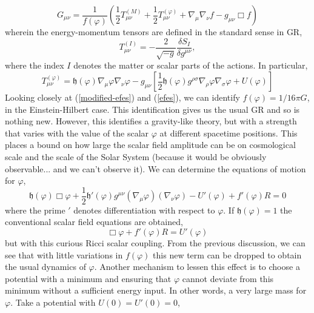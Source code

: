 \begin{equation}\label{modified-efes}
    G_{\mu\nu} = \frac{1}{f(\varphi)}\left(\frac{1}{2}T_{\mu\nu}^{(M)} + \frac{1}{2}T_{\mu\nu}^{(\varphi)} + \nabla_{\mu}\nabla_{\nu}f - g_{\mu\nu}\Box f\right)
\end{equation}
wherein the energy-momentum tensors are defined in the standard sense in GR,
\begin{equation}
T^{(I)}_{\mu\nu} = -\frac{2}{\sqrt{-g}}\frac{\delta S_{I}}{\delta g^{\mu\nu}},
\end{equation}
where the index $I$ denotes the matter or scalar parts of the actions. In particular, 
\begin{equation}
    T_{\mu\nu}^{(\varphi)} = \mathfrak{h}(\varphi)\nabla_{\mu}\varphi\nabla_{\nu}\varphi - g_{\mu\nu}\left[\frac{1}{2}\mathfrak{h}(\varphi)g^{\rho\sigma}\nabla_{\rho}\varphi\nabla_{\sigma}\varphi + U(\varphi)\right]
\end{equation}
Looking closely at (\ref{modified-efes}) and (\ref{efes}), we can identify $f(\varphi) = 1/16\pi G$, in the Einstein-Hilbert case. This identification gives us the usual GR and so is nothing new. However, this identifies a gravity-like theory, but with a strength that varies with the value of the scalar $\varphi$ at different spacetime positions. This places a bound on how large the scalar field amplitude can be on cosmological scale and the scale of the Solar System (because it would be obviously observable... and we can't observe it). We can determine the equations of motion for $\varphi$, 
\begin{equation}
    \mathfrak{h}(\varphi)\Box\varphi + \frac{1}{2}\mathfrak{h}'(\varphi)g^{\mu\nu}(\nabla_{\mu}\varphi)(\nabla_{\nu}\varphi) - U'(\varphi) + f'(\varphi)R = 0
\end{equation}
where the prime $'$ denotes differentiation with respect to $\varphi$. If $\mathfrak{h}(\varphi) = 1$ the conventional scalar field equations are obtained, 
\begin{equation}
    \Box\varphi + f'(\varphi)R= U'(\varphi)
\end{equation}
but with this curious Ricci scalar coupling. From the previous discussion, we can see that with little variations in $f(\varphi)$ this new term can be dropped to obtain the usual dynamics of $\varphi$. Another mechanism to lessen this effect is to choose a potential
with a minimum and ensuring that $\varphi$ cannot deviate from this minimum without a sufficient energy input. In other words, a very large mass for $\varphi$. Take a potential with $U(0) = U'(0) = 0$, 

